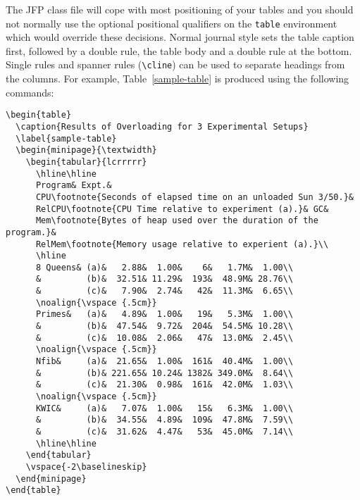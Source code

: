 \documentclass{jfp1}
\begin{document}
The JFP class file will cope with most positioning of your tables
and you should not normally use the optional positional qualifiers on the
\verb"table" environment which would override these decisions.
Normal journal style sets the table caption first, followed by a double
rule, the table body and a double rule at the bottom. Single rules and
spanner rules (\verb"\cline") can be used to separate headings from the
columns. For example, Table~\ref{sample-table} is produced using the
following commands:\par
%
{\small
\begin{verbatim}
\begin{table}
  \caption{Results of Overloading for 3 Experimental Setups}
  \label{sample-table}
  \begin{minipage}{\textwidth}
    \begin{tabular}{lcrrrrr}
      \hline\hline
      Program& Expt.&
      CPU\footnote{Seconds of elapsed time on an unloaded Sun 3/50.}&
      RelCPU\footnote{CPU Time relative to experiment (a).}& GC&
      Mem\footnote{Bytes of heap used over the duration of the program.}&
      RelMem\footnote{Memory usage relative to experient (a).}\\
      \hline
      8 Queens& (a)&   2.88&  1.00&    6&   1.7M&  1.00\\
      &         (b)&  32.51& 11.29&  193&  48.9M& 28.76\\
      &         (c)&   7.90&  2.74&   42&  11.3M&  6.65\\
      \noalign{\vspace {.5cm}}
      Primes&   (a)&   4.89&  1.00&   19&   5.3M&  1.00\\
      &         (b)&  47.54&  9.72&  204&  54.5M& 10.28\\
      &         (c)&  10.08&  2.06&   47&  13.0M&  2.45\\
      \noalign{\vspace {.5cm}}
      Nfib&     (a)&  21.65&  1.00&  161&  40.4M&  1.00\\
      &         (b)& 221.65& 10.24& 1382& 349.0M&  8.64\\
      &         (c)&  21.30&  0.98&  161&  42.0M&  1.03\\
      \noalign{\vspace {.5cm}}
      KWIC&     (a)&   7.07&  1.00&   15&   6.3M&  1.00\\
      &         (b)&  34.55&  4.89&  109&  47.8M&  7.59\\
      &         (c)&  31.62&  4.47&   53&  45.0M&  7.14\\
      \hline\hline
    \end{tabular}
    \vspace{-2\baselineskip}
  \end{minipage}
\end{table}
\end{verbatim}}
\end{document}
